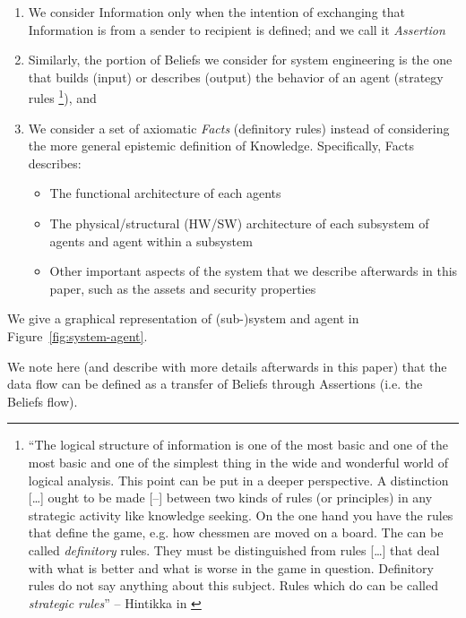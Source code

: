 \begin{enumerate}
	\item We consider Information only when the intention of exchanging 
		that Information is from a sender to 
		recipient is defined; and we call it \emph{Assertion}  
	\item Similarly, the portion of Beliefs we consider for system
		engineering is the one that builds (input) or describes
		(output) the behavior of an agent (strategy rules
		\footnote{``The logical structure of information is one of the
		most basic and one of the most basic and one of the simplest
		thing in the wide and wonderful world of logical analysis. This
		point can be put in a deeper perspective. A distinction
		[\ldots] ought to be made [--] between two kinds of rules (or
		principles) in any strategic activity like knowledge seeking.
		On the one hand you have the rules that define the game, e.g.
		how chessmen are moved on a board. The can be called
		\emph{definitory} rules.  They must be distinguished from rules
		[\ldots] that deal with what is better and what is worse in the
		game in question.  Definitory rules do not say anything about
		this subject. Rules which do can be called \emph{strategic
		rules}'' -- Hintikka in \autocite{Hintikka1993Information}}),
		and
	\item We consider a set of axiomatic \emph{Facts} (definitory rules) instead
		of considering the more general epistemic definition of
		Knowledge. Specifically, Facts describes:
		\begin{itemize}
			\item The functional architecture of each agents
			\item The physical/structural (HW/SW) architecture of each
				subsystem of agents and agent within a
				subsystem
			\item Other important aspects of the system that we
				describe afterwards in this paper, such as
				the assets and security properties 
		\end{itemize}
\end{enumerate}
We give a graphical representation of (sub-)system and agent in Figure~\ref{fig:system-agent}.

We note here (and describe with more details afterwards in this paper) that the
data flow can be defined as a transfer of Beliefs through Assertions (i.e. the
Beliefs flow).

